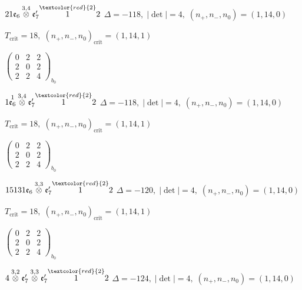 \documentclass[10pt]{article}
\begin{document}
$21\mathfrak{e}_6\overset{3,4}{\otimes}\mathfrak{e}_7'\overset{\textcolor{red}{2}}{1}2$ \quad $\Delta=-118,\; |\det|=4,\; (n_+,n_-,n_0)=(1,14,0)$

\hspace{1em}$T_{\text{crit}}=18,\; (n_+,n_-,n_0)_{\text{crit}}=(1,14,1)$

\hspace{2em}$\left(\begin{smallmatrix}0 & 2 & 2 \\ 2 & 0 & 2 \\ 2 & 2 & 4\end{smallmatrix}\right)_{\!b_0}$

\smallskip

$1\overset{1}{\mathfrak{e}_6}\overset{3,4}{\otimes}\mathfrak{e}_7'\overset{\textcolor{red}{2}}{1}2$ \quad $\Delta=-118,\; |\det|=4,\; (n_+,n_-,n_0)=(1,14,0)$

\hspace{1em}$T_{\text{crit}}=18,\; (n_+,n_-,n_0)_{\text{crit}}=(1,14,1)$

\hspace{2em}$\left(\begin{smallmatrix}0 & 2 & 2 \\ 2 & 0 & 2 \\ 2 & 2 & 4\end{smallmatrix}\right)_{\!b_0}$

\smallskip

$15131\mathfrak{e}_6\overset{3,3}{\otimes}\mathfrak{e}_7'\overset{\textcolor{red}{2}}{1}2$ \quad $\Delta=-120,\; |\det|=4,\; (n_+,n_-,n_0)=(1,14,0)$

\hspace{1em}$T_{\text{crit}}=18,\; (n_+,n_-,n_0)_{\text{crit}}=(1,14,1)$

\hspace{2em}$\left(\begin{smallmatrix}0 & 2 & 2 \\ 2 & 0 & 2 \\ 2 & 2 & 4\end{smallmatrix}\right)_{\!b_0}$

\smallskip

$4\overset{3,2}{\otimes}\mathfrak{e}_7'\overset{3,3}{\otimes}\mathfrak{e}_7'\overset{\textcolor{red}{2}}{1}2$ \quad $\Delta=-124,\; |\det|=4,\; (n_+,n_-,n_0)=(1,14,0)$
\end{document}
